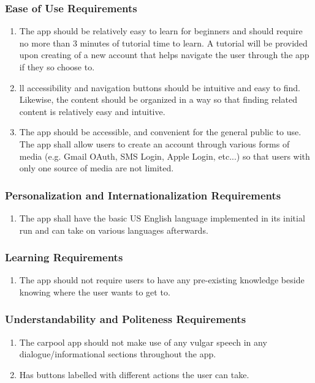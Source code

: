 \documentclass[]{article}
\begin{document}
\subsubsection{Ease of Use Requirements}
\label{ssub:ease_of_use_requirements}
\begin{enumerate}[{UH-EOU}1. ]
	\item The app should be relatively easy to learn for beginners and should require no more than 3 minutes of tutorial time to learn. A tutorial will be provided upon creating of a new account that helps navigate the user through the app if they so choose to.
	\item ll accessibility and navigation buttons should be intuitive and easy to find. Likewise, the content should be organized in a way so that finding related content is relatively easy and intuitive.
	\item The app should be accessible, and convenient for the general public to use. The app shall allow users to create an account through various forms of media (e.g. Gmail OAuth, SMS Login, Apple Login, etc...) so that users with only one source of media are not limited.
\end{enumerate}

\subsubsection{Personalization and Internationalization Requirements}
\label{ssub:personalization_and_internationalization_requirements}
\begin{enumerate}[{UH-PI}1. ]
	\item The app shall have the basic US English language implemented in its initial run and can take on various languages afterwards.
\end{enumerate}

\subsubsection{Learning Requirements}
\label{ssub:learning_requirements}
\begin{enumerate}[{UH-L}1. ]
	\item The app should not require users to have any pre-existing knowledge beside knowing where the user wants to get to.
\end{enumerate}

\subsubsection{Understandability and Politeness Requirements}
\label{ssub:understandability_and_politeness_requirements}
\begin{enumerate}[{UH-UP}1. ]
	\item The carpool app should not make use of any vulgar speech in any dialogue/informational sections throughout the app.
	\item Has buttons labelled with different actions the user can take.
\end{enumerate}
\end{document}
